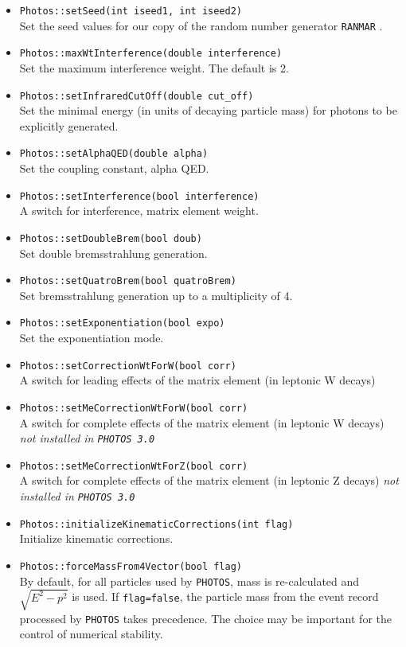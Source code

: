 \documentclass[]{Photos_interface_design}
\begin{document}
\begin{itemize}
  \item {\tt Photos::setSeed(int iseed1, int iseed2)} \\
        Set the  seed values for our copy of the random number generator {\tt RANMAR} \cite{James:1988vf,marsaglia:1987}.
  \item {\tt Photos::maxWtInterference(double interference)} \\
        Set the maximum interference weight. The default is 2.
  \item {\tt Photos::setInfraredCutOff(double cut\_off)} \\
        Set the minimal energy (in units of decaying particle mass)
        for photons to be explicitly generated.
  \item {\tt Photos::setAlphaQED(double alpha)} \\
        Set the coupling constant, alpha QED.
  \item {\tt Photos::setInterference(bool interference)} \\
        A switch for interference, matrix element weight.
  \item {\tt Photos::setDoubleBrem(bool doub)} \\
        Set double bremsstrahlung generation.
  \item {\tt Photos::setQuatroBrem(bool quatroBrem)} \\
        Set bremsstrahlung generation up to a multiplicity of 4.
  \item {\tt Photos::setExponentiation(bool expo)} \\
        Set the exponentiation mode.
  \item {\tt Photos::setCorrectionWtForW(bool corr)} \\
         A switch for leading effects of the matrix element (in leptonic W decays)
  \item {\tt Photos::setMeCorrectionWtForW(bool corr)} \\
         A switch for complete effects of the matrix element (in leptonic W decays) {\it not installed in {\tt PHOTOS 3.0} }
  \item {\tt Photos::setMeCorrectionWtForZ(bool corr)} \\
         A switch for complete effects of the matrix element (in leptonic Z decays) {\it not installed in {\tt PHOTOS 3.0} }
  \item {\tt Photos::initializeKinematicCorrections(int flag)} \\
        Initialize kinematic corrections.
  \item {\tt Photos::forceMassFrom4Vector(bool flag)} \\
        By default, for all particles used by {\tt PHOTOS}, 
        mass is re-calculated and $\sqrt{E^2-p^2}$ is used. 
        If {\tt flag=false}, the particle mass from the event record processed by 
        {\tt PHOTOS} takes precedence. The choice may be important for the control 
        of numerical stability.
		
\end{itemize}
\end{document}
